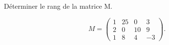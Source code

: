 \documentclass[a4paper,12pt]{report}
\begin{document}
Déterminer le rang de la matrice M.

\[M=\begin{pmatrix}
1 & 25 & 0 & 3\\
2 & 0 & 10 & 9\\
1 & 8 & 4  &-3
\end{pmatrix}.\]
\end{document}
